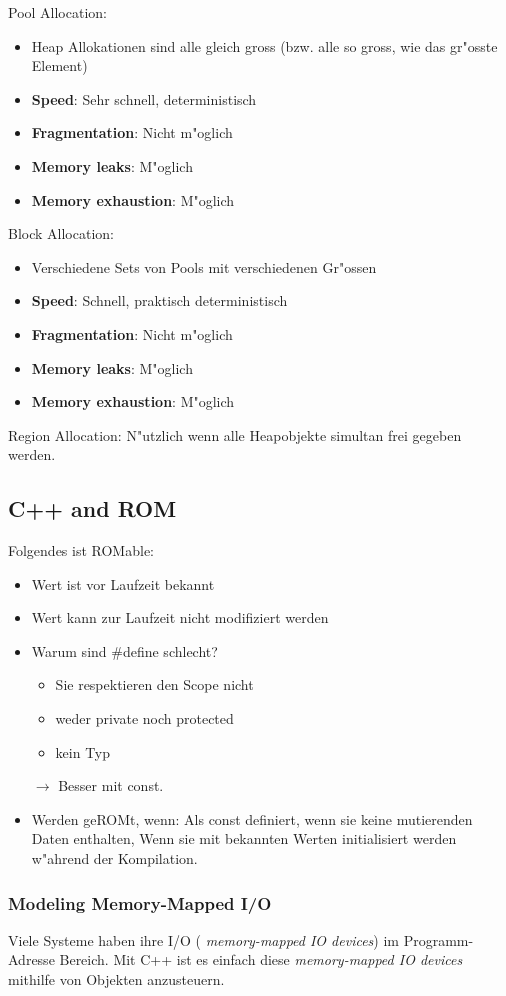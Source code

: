 Pool Allocation: 
\begin{itemize}
\item Heap Allokationen sind alle gleich gross (bzw. alle so gross, wie das gr"osste Element) 
\item \textbf{Speed}: Sehr schnell, deterministisch 
\item \textbf{Fragmentation}: Nicht m"oglich
\item \textbf{Memory leaks}: M"oglich
\item \textbf{Memory exhaustion}: M"oglich
\end{itemize}

Block Allocation: 
\begin{itemize}
\item Verschiedene Sets von Pools mit verschiedenen Gr"ossen 
\item \textbf{Speed}: Schnell, praktisch deterministisch 
\item \textbf{Fragmentation}: Nicht m"oglich
\item \textbf{Memory leaks}: M"oglich
\item \textbf{Memory exhaustion}: M"oglich
\end{itemize}

Region Allocation: N"utzlich wenn alle Heapobjekte simultan frei gegeben werden. 

\subsection{C++ and ROM}
Folgendes ist ROMable: 
\begin{itemize}
\item Wert ist vor Laufzeit bekannt
\item Wert kann zur Laufzeit nicht modifiziert werden
\item Warum sind \#define schlecht?
	\begin{itemize}
		\item Sie respektieren den Scope nicht
		\item weder private noch protected
		\item kein Typ
	\end{itemize}
	$\rightarrow$ Besser mit const.
\item Werden geROMt, wenn: Als const definiert, wenn sie keine mutierenden
	Daten enthalten, Wenn sie mit bekannten Werten initialisiert werden
	w"ahrend der Kompilation.
\end{itemize}


\subsubsection{Modeling Memory-Mapped I/O}
Viele Systeme haben ihre I/O (\textit{ memory-mapped IO devices}) im Programm-Adresse Bereich. Mit C++ ist es einfach diese \textit{ memory-mapped IO devices} mithilfe von Objekten anzusteuern.\\ \\

